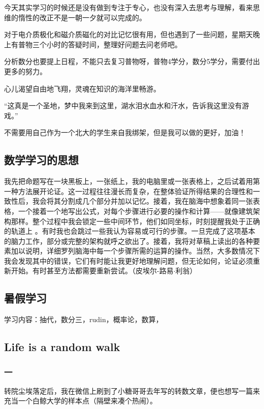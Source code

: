 \documentclass[12pt, a4paper, oneside]{ctexart}
\begin{document}
今天其实学习的时候还是没有做到专注于专心，也没有深入去思考与理解，看来思维的惰性的改正不是一朝一夕就可以完成的。

对于电介质极化和磁介质磁化的对比记忆很有用，但也遇到了一些问题，星期天晚上有普物三个小时的答疑时间，整理好问题去问老师吧。

分析数分也要提上日程，不能只去复习普物呀，普物4学分，数分5学分，需要付出更多的努力。

心儿渴望自由地飞翔，灵魂在知识的海洋里畅游。

“这真是一个圣地，梦中我来到这里，湖水泪水血水和汗水，告诉我这里没有游戏。”

不需要用自己作为一个北大的学生来自我绑架，但是我可以做的更好，加油！

\newpage

\subsection{数学学习的思想}

我先把命题写在一块黑板上，一张纸上，我的电脑里或一张表格上，之后试着用第一种方法展开论证。这一过程往往漫长而复杂，在整体验证所得结果的合理性和一致性后，我会将其分割成几个部分并加以记忆。接着，我在脑海中想象着同一张表格，一个接着一个地写出公式，对每个步骤进行必要的操作和计算——就像建筑架构那样。整个过程中我会锁定一些中间环节，他们如同坐标，时刻提醒我处于正确的轨道上 。有时我也会跳过一些我认为容易或可行的步骤。一旦完成了这项基本的脑力工作，部分或完整的架构就呼之欲出了。接着，我将对草稿上读出的各种要素加以说明，详细罗列脑海中每一个步骤所需的运算的操作。当然，大多数情况下我会发现其中的错误，它们有时能让我更好地理解问题，但无论如何，论证必须重新开始。有时甚至方法都需要重新尝试。（皮埃尔-路易$\cdot$利翁）

\newpage
\subsection{暑假学习}
学习内容：抽代，数分三，rudin，概率论，数算，

\newpage
\subsection{Life is a random walk}

\subsubsection{一}
转院尘埃落定后，我在微信上刷到了小糖哥哥去年写的转数文章，便也想写一篇来充当一个白鲸大学的样本点（隔壁来凑个热闹）。
\end{document}

